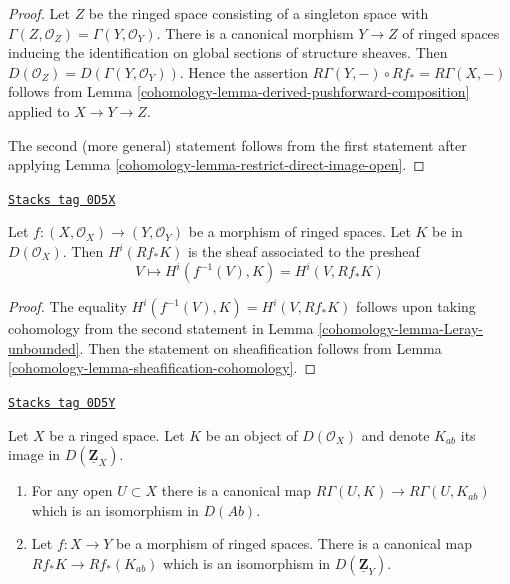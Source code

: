 \begin{proof}

Let $Z$ be the ringed space consisting of a singleton
space with $\Gamma(Z, \mathcal{O}_Z) = \Gamma(Y, \mathcal{O}_Y)$.
There is a canonical morphism $Y \to Z$ of ringed spaces
inducing the identification on global sections of structure sheaves.
Then $D(\mathcal{O}_Z) = D(\Gamma(Y, \mathcal{O}_Y))$.
Hence the assertion $R\Gamma(Y, -) \circ Rf_* = R\Gamma(X, -)$
follows from Lemma \ref{cohomology-lemma-derived-pushforward-composition}
applied to $X \to Y \to Z$.

\medskip\noindent
The second (more general) statement follows from the first statement
after applying Lemma \ref{cohomology-lemma-restrict-direct-image-open}.
\end{proof}

\begin{lemma}
\label{cohomology-lemma-unbounded-describe-higher-direct-images}
\href{https://stacks.math.columbia.edu/tag/0D5X}{\texttt{Stacks tag 0D5X}}

Let $f : (X, \mathcal{O}_X) \to (Y, \mathcal{O}_Y)$ be a morphism of ringed
spaces. Let $K$ be in $D(\mathcal{O}_X)$. Then $H^i(Rf_*K)$ is the sheaf
associated to the presheaf
$$
V \mapsto H^i(f^{-1}(V), K) = H^i(V, Rf_*K)
$$
\end{lemma}

\begin{proof}

The equality $H^i(f^{-1}(V), K) = H^i(V, Rf_*K)$ follows upon taking
cohomology from the second statement in
Lemma \ref{cohomology-lemma-Leray-unbounded}. Then the statement on sheafification
follows from Lemma \ref{cohomology-lemma-sheafification-cohomology}.
\end{proof}

\begin{lemma}
\label{cohomology-lemma-modules-abelian-unbounded}
\href{https://stacks.math.columbia.edu/tag/0D5Y}{\texttt{Stacks tag 0D5Y}}

Let $X$ be a ringed space. Let $K$ be an object of $D(\mathcal{O}_X)$
and denote $K_{ab}$ its image in $D(\underline{\mathbf{Z}}_X)$.
\begin{enumerate}
\item For any open $U \subset X$ there is a canonical map
$R\Gamma(U, K) \to R\Gamma(U, K_{ab})$
which is an isomorphism in $D(\textit{Ab})$.
\item Let $f : X \to Y$ be a morphism of ringed spaces.
There is a canonical map $Rf_*K \to Rf_*(K_{ab})$ which
is an isomorphism in $D(\underline{\mathbf{Z}}_Y)$.
\end{enumerate}
\end{lemma}

